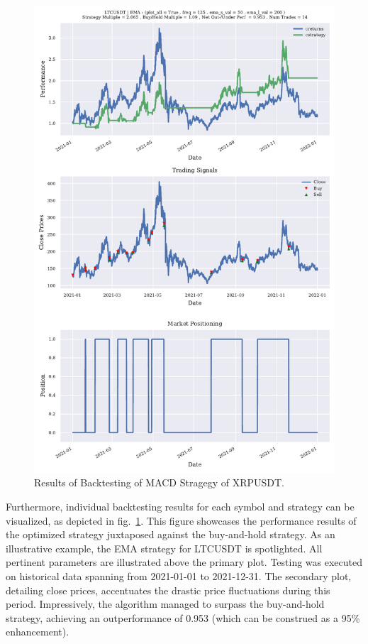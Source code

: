 \begin{figure}
\centering
\includegraphics[page=1, trim=0mm 0mm 0 0mm, width=1\textwidth, clip]{./uml/backtesting_results.pdf}
\caption{Results of Backtesting of MACD Stragegy of XRPUSDT.}
\label{fig:backtest_results}
\end{figure}

Furthermore, individual backtesting results for each symbol and strategy can be visualized, as depicted in fig.~\ref{fig:backtest_results}.
This figure showcases the performance results of the optimized strategy juxtaposed against the buy-and-hold strategy.
As an illustrative example, the EMA strategy for LTCUSDT is spotlighted. All pertinent parameters are illustrated above the primary plot.
Testing was executed on historical data spanning from 2021-01-01 to 2021-12-31.
The secondary plot, detailing close prices, accentuates the drastic price fluctuations during this period.
 Impressively, the algorithm managed to surpass the buy-and-hold strategy, achieving an outperformance of 0.953 (which can be construed as a 95\% enhancement).

